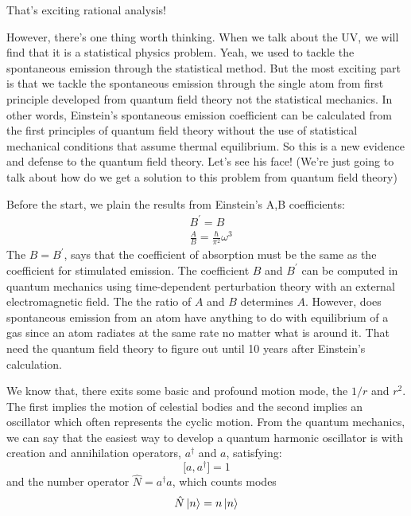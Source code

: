 \documentclass[12pt,openany]{book}
\begin{document}
	That's exciting rational analysis!\par 
	However, there's one thing worth thinking. When we talk about the UV, we will find that it is a statistical physics problem. 
	Yeah, we used to tackle the spontaneous emission through the statistical method. But the most exciting part is that 
	we tackle the spontaneous emission through the single atom from first principle developed from quantum field theory not the 
	statistical mechanics. In other words, Einstein's spontaneous emission coefficient can be calculated from the first principles of quantum field theory without the use of statistical mechanical conditions that assume thermal equilibrium. 
	So this is a new evidence and defense to the quantum field theory. Let's see his face! (We're just going to talk about how do we get a solution to this problem from quantum field theory)
	\par 
	Before the start, we plain the results from Einstein's A,B coefficients:
	\begin{equation}
		\begin{aligned}
			&B^\prime=B\\
			&\frac{A}{B}=\frac{\hbar }{\pi^2}\omega^3
		\end{aligned}
	\end{equation}
	The $B=B^\prime$, says that the coefficient of absorption must be the same as the coefficient for stimulated emission. 
	The coefficient $B$ and $B^\prime$ can be computed in quantum mechanics using time-dependent perturbation theory with an
	external electromagnetic field. The the ratio of $A$ and $B$ determines $A$. However, does spontaneous emission from an atom
	have anything to do with equilibrium of a gas since an atom radiates at the same rate no matter what is around it. That need the 
	quantum field theory to figure out until 10 years after Einstein's calculation.
	\par 
	We know that, there exits some basic and profound motion mode, the $1/r$ and $r^2$. The first implies the motion of celestial bodies and the second 
	implies an oscillator which often represents the cyclic motion. From the quantum mechanics, we can say that the easiest way to develop 
	a quantum harmonic oscillator is with creation and annihilation operators, $a^\dagger$ and $a$, satisfying:
	\begin{equation}
		\big[a,a^\dagger\big]=1
	\end{equation}
	and the number operator $\hat{N}=a^\dagger a$, which counts modes
	\begin{equation}
		\hat{N}\ket{n}=n\ket{n}
	\end{equation}
\end{document}
